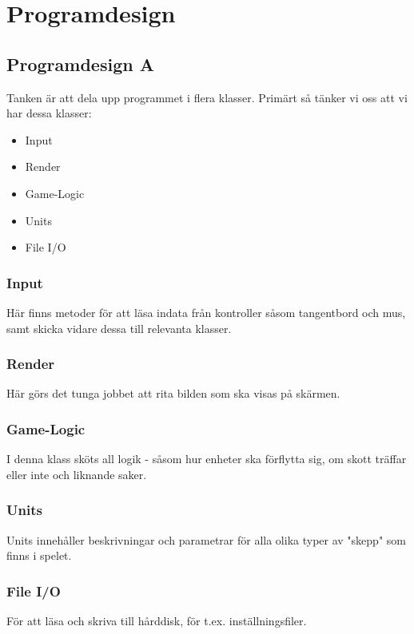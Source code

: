 \documentclass[a4paper,11pt]{article}
\begin{document}
\section{Programdesign}
\subsection{Programdesign A}
Tanken är att dela upp programmet i flera klasser. Primärt så tänker vi oss att vi har dessa klasser:
\begin{multicols}{2}
\begin{itemize}
\item Input
\item Render
\item Game-Logic
\item Units
\item File I/O
\end{itemize}
\end{multicols}

\subsubsection{Input}
Här finns metoder för att läsa indata från kontroller såsom tangentbord och mus, samt skicka vidare dessa till relevanta klasser.

\subsubsection{Render}
Här görs det tunga jobbet att rita bilden som ska visas på skärmen.

\subsubsection{Game-Logic}
I denna klass sköts all logik - såsom hur enheter ska förflytta sig, om skott träffar eller inte och liknande saker.

\subsubsection{Units}
Units innehåller beskrivningar och parametrar för alla olika typer av "skepp" som finns i spelet.

\subsubsection{File I/O}
För att läsa och skriva till hårddisk, för t.ex. inställningsfiler.
\end{document}
